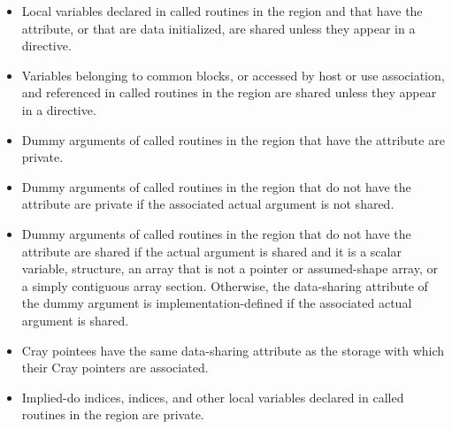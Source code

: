 \begin{fortranspecific}
\begin{itemize}
\item Local variables declared in called routines in the region and that have the 
attribute, or that are data initialized, are shared unless they appear in a
 directive.

\item Variables belonging to common blocks, or accessed by host or use association, and referenced in called routines in the region are shared unless they appear in a  directive.

\item Dummy arguments of called routines in the region that have the
     attribute are private.

\item Dummy arguments of called routines in the region that do not have the
     attribute are private if the associated actual argument is not
    shared.

\item Dummy arguments of called routines in the region that do not have the
 attribute are shared if the actual argument is shared and it
is a scalar variable, structure, an array that is not a pointer or
assumed-shape array, or a simply contiguous array section.  Otherwise, the
data-sharing attribute of the dummy argument is implementation-defined if
the associated actual argument is shared.

\item Cray pointees have the same data-sharing attribute as the storage with which their Cray pointers are associated.

\item Implied-do indices,  indices, and other local variables declared in called
routines in the region are private.
\end{itemize}
\end{fortranspecific}
%
%
%
%
%
%
%
%
